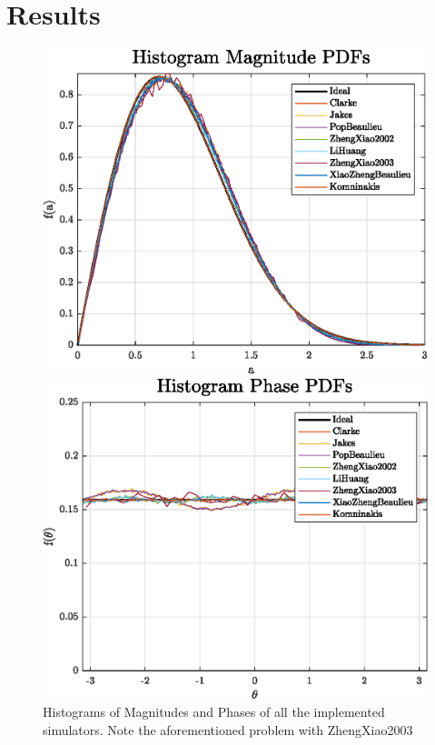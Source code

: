 \section{Results} %
\label{sec:results}

\begin{figure}
\hfill
\begin{minipage}{.45\linewidth}
	\includegraphics[width=\linewidth]{img/histMag.eps}
\end{minipage}
\hfill
\begin{minipage}{.45\linewidth}
	\includegraphics[width=\linewidth]{img/histPhase.eps}
\end{minipage}
\hfill

\caption{Histograms of Magnitudes and Phases of all the implemented simulators. Note the aforementioned problem with ZhengXiao2003}
\label{fig:histograms}
\end{figure}

